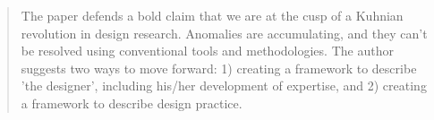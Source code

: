 

		\begin{quote}
		\small
		The paper defends a bold claim that we are at the cusp of a Kuhnian revolution in design research.
		Anomalies are accumulating, and they can't be resolved using conventional tools and
		methodologies.
		The author suggests two ways to move forward:
		1) creating a framework to describe 'the designer', including his/her development of expertise, and
		2) creating a framework to describe design practice.
		\end{quote}

